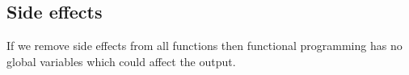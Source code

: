 
\subsection{Side effects}



If we remove side effects from all functions then functional programming has no global variables which could affect the output.

